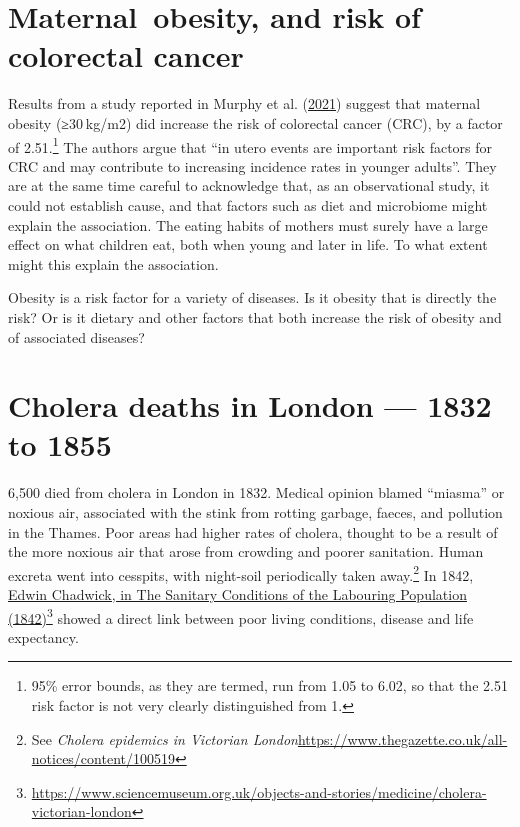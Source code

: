 \documentclass[
  10ptls,
  b5paper]{book}
\begin{document}
\hypertarget{maternal-obesity-and-risk-of-colorectal-cancer}{%
\section{Maternal~obesity, and risk of colorectal cancer}\label{maternal-obesity-and-risk-of-colorectal-cancer}}

Results from a study reported in Murphy et al. (\protect\hyperlink{ref-Murphygutjnl-2021-325001}{2021}) suggest that maternal obesity (≥30 kg/m2) did increase the risk of colorectal cancer (CRC), by a factor of 2.51.\footnote{95\% error bounds, as they are termed, run from 1.05 to 6.02, so that the 2.51 risk factor is not very clearly distinguished from 1.} The authors argue that ``in utero events are important risk factors for CRC and may contribute to increasing incidence rates in younger adults''. They are at the same time careful to acknowledge that, as an observational study, it could not establish cause, and that factors such as diet and microbiome might explain the association. The eating habits of mothers must surely have a large effect on what children eat, both when young and later in life. To what extent might this explain the association.

Obesity is a risk factor for a variety of diseases. Is it obesity that is directly the risk? Or is it dietary and other factors that both increase the risk of obesity and of associated diseases?

\hypertarget{cholera-deaths-in-london-1832-to-1855}{%
\section{Cholera deaths in London --- 1832 to 1855}\label{cholera-deaths-in-london-1832-to-1855}}

6,500 died from cholera in London in 1832. Medical opinion blamed ``miasma'' or noxious air, associated with the stink from rotting garbage, faeces, and pollution in the Thames. Poor areas had higher rates of cholera, thought to be a result of the more noxious air that arose from crowding and poorer sanitation. Human excreta went into cesspits, with night-soil periodically taken away.\footnote{See \emph{Cholera epidemics in Victorian London}\newline \url{https://www.thegazette.co.uk/all-notices/content/100519}} In 1842, \href{https://www.sciencemuseum.org.uk/objects-and-stories/medicine/cholera-victorian-london}{Edwin Chadwick, in The Sanitary Conditions of the Labouring Population (1842)}\footnote{\url{https://www.sciencemuseum.org.uk/objects-and-stories/medicine/cholera-victorian-london}} showed a direct link between poor living conditions, disease and life expectancy.
\end{document}
